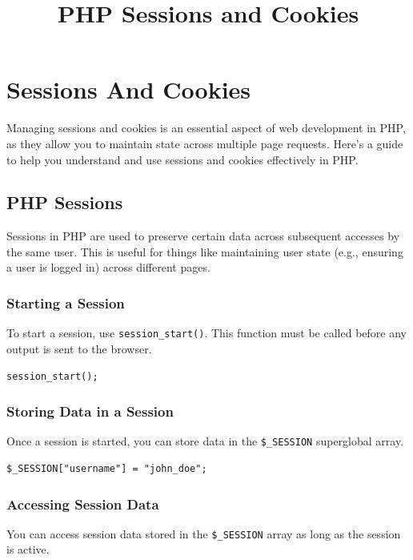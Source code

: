 \documentclass[11pt]{article}
\date{}
\title{PHP Sessions and Cookies}
\begin{document}
\maketitle
\setcounter{tocdepth}{3}
\tableofcontents

\setlength\parindent{10pt}

\section{Sessions And Cookies}
\label{sec:orge4e42ef}
Managing sessions and cookies is an essential aspect of web development
in PHP, as they allow you to maintain state across multiple page
requests. Here's a guide to help you understand and use sessions and
cookies effectively in PHP.

\subsection{PHP Sessions}
\label{sec:org9f1dfaa}
Sessions in PHP are used to preserve certain data across subsequent
accesses by the same user. This is useful for things like maintaining
user state (e.g., ensuring a user is logged in) across different pages.

\subsubsection{Starting a Session}
\label{sec:orgf9c3620}
To start a session, use \texttt{session\_start()}. This function must be called
before any output is sent to the browser.

\begin{verbatim}
session_start();
\end{verbatim}

\subsubsection{Storing Data in a Session}
\label{sec:org9b417ed}
Once a session is started, you can store data in the \texttt{\$\_SESSION}
superglobal array.

\begin{verbatim}
$_SESSION["username"] = "john_doe";
\end{verbatim}

\subsubsection{Accessing Session Data}
\label{sec:org7af6b31}
You can access session data stored in the \texttt{\$\_SESSION} array as long as
the session is active.
\end{document}
